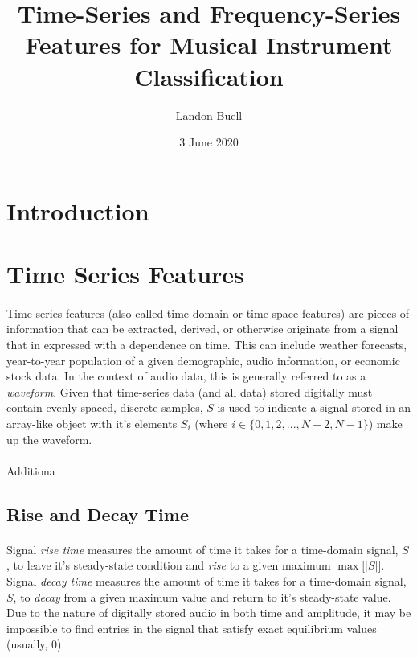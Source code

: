 \documentclass[12pt,letterpaper]{article}
\begin{document}

\title{Time-Series and Frequency-Series Features for Musical Instrument Classification}
\date{3 June 2020}
\author{Landon Buell}
\maketitle


\section{Introduction}



\section{Time Series Features}

\paragraph*{}Time series features (also called time-domain or time-space features) are pieces of information that can be extracted, derived, or otherwise originate from a signal that in expressed with a dependence on time. This can include weather forecasts, year-to-year population of a given demographic, audio information, or economic stock data. In the context of audio data, this is generally referred to as a \textit{waveform}. Given that time-series data (and all data) stored digitally must contain evenly-spaced, discrete samples, $S$ is used to indicate a signal stored in an array-like object with it's elements $S_i$ (where $i \in \{ 0,1,2,...,N-2,N-1\}$) make up the waveform.

\paragraph*{}Additiona




\subsection{Rise and Decay Time}

\paragraph*{}Signal \textit{rise time} measures the amount of time it takes for a time-domain signal, $S$, to leave it's steady-state condition and \textit{rise} to a given maximum $\max\big[|S|\big]$. Signal \textit{decay time} measures the amount of time it takes for a time-domain signal, $S$, to \textit{decay} from a given maximum value and return to it's steady-state value. Due to the nature of digitally stored audio in both time and amplitude, it may be impossible to find entries in the signal that satisfy exact equilibrium values (usually, $0$).
\end{document}
